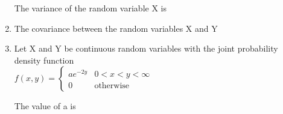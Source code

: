 \begin{enumerate}[label=\thesection.\arabic*.,ref=\thesection.\theenumi]
    The variance of the random variable X is 
    
    \begin{enumerate}
    \end{enumerate}
    
    \item The covariance between the random variables X and Y
    
    \begin{enumerate}
    \end{enumerate}
    
        
\item         Let X and Y be continuous random variables with the joint probability density function \\
        
        $
        f(x,y)=
        \begin{cases}
        a{e^{-2y}}
        & 0 <x<y< \infty \\
        0 & \text{otherwise}
        \end{cases}
        $
        
        The value of a is
        
        \begin{enumerate}
\end{enumerate}
\end{enumerate}
